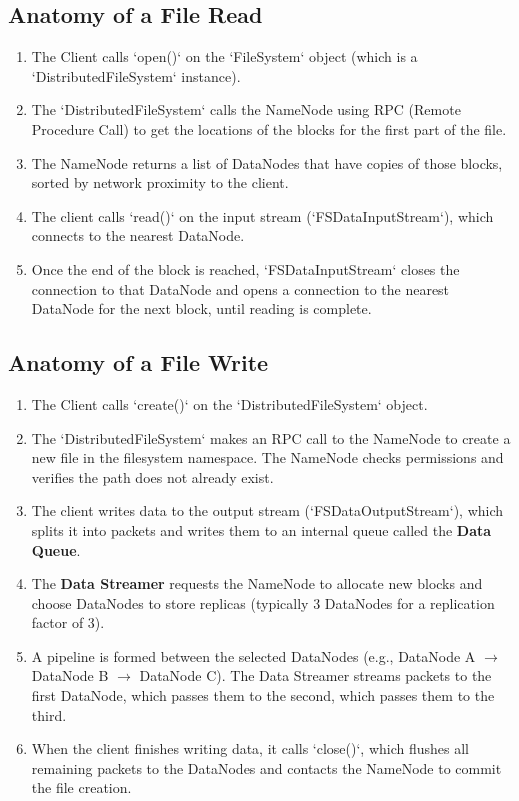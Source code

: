 \documentclass[12pt,a4paper]{article}
\begin{document}
\subsection{Anatomy of a File Read}
\begin{enumerate}[leftmargin=*, itemsep=3pt]
  \item The Client calls `open()` on the `FileSystem` object (which is a `DistributedFileSystem` instance).
  \item The `DistributedFileSystem` calls the NameNode using RPC (Remote Procedure Call) to get the locations of the blocks for the first part of the file.
  \item The NameNode returns a list of DataNodes that have copies of those blocks, sorted by network proximity to the client.
  \item The client calls `read()` on the input stream (`FSDataInputStream`), which connects to the nearest DataNode.
  \item Once the end of the block is reached, `FSDataInputStream` closes the connection to that DataNode and opens a connection to the nearest DataNode for the next block, until reading is complete.
\end{enumerate}

\subsection{Anatomy of a File Write}
\begin{enumerate}[leftmargin=*, itemsep=3pt]
  \item The Client calls `create()` on the `DistributedFileSystem` object.
  \item The `DistributedFileSystem` makes an RPC call to the NameNode to create a new file in the filesystem namespace. The NameNode checks permissions and verifies the path does not already exist.
  \item The client writes data to the output stream (`FSDataOutputStream`), which splits it into packets and writes them to an internal queue called the \textbf{Data Queue}.
  \item The \textbf{Data Streamer} requests the NameNode to allocate new blocks and choose DataNodes to store replicas (typically 3 DataNodes for a replication factor of 3).
  \item A pipeline is formed between the selected DataNodes (e.g., DataNode A $\rightarrow$ DataNode B $\rightarrow$ DataNode C). The Data Streamer streams packets to the first DataNode, which passes them to the second, which passes them to the third.
  \item When the client finishes writing data, it calls `close()`, which flushes all remaining packets to the DataNodes and contacts the NameNode to commit the file creation.
\end{enumerate}
\end{document}
